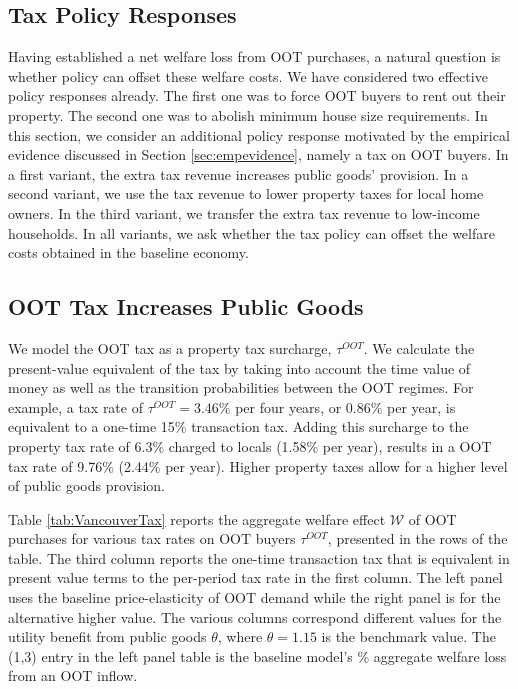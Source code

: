 \documentclass[letterpaper,12pt,dvipsnames,usenames]{article}
\theoremstyle{definition}
\begin{document}
\begin{spacing}{1.25}
{\section{Tax Policy Responses} \label{sec:Vancouver}

Having established a net welfare loss from OOT purchases, a natural question is whether policy can offset these welfare costs. We have considered two effective policy responses already. The first one was to force OOT buyers to rent out their property. The second one was to abolish minimum house size requirements.  In this section, we consider an additional policy response motivated by the empirical evidence discussed in Section \ref{sec:empevidence}, namely a tax on OOT buyers. In a first variant, the extra tax revenue increases public goods' provision. In a second variant, we use the tax revenue to lower property taxes for local home owners. In the third variant, we transfer the extra tax revenue to low-income households. In all variants, we ask whether the tax policy can offset the welfare costs obtained in the baseline economy.

\subsection{OOT Tax Increases Public Goods}

We model the OOT tax as a property tax surcharge, $\tau^{OOT}$. We calculate the present-value equivalent of the tax by taking into account the time value of money as well as the transition probabilities between the OOT regimes. For example, a tax rate of $\tau^{OOT}=3.46\%$ per four years, or 0.86\% per year, is equivalent to a one-time 15\% transaction tax. Adding this surcharge to the property tax rate of 6.3\% charged to locals (1.58\% per year), results in a OOT tax rate of 9.76\% (2.44\% per year). Higher property taxes allow for a higher level of public goods provision.

Table \ref{tab:VancouverTax} reports the aggregate welfare effect $\mathcal{W}$ of OOT purchases for various tax rates on OOT buyers $\tau^{OOT}$, presented in the rows of the table. The third column reports the one-time transaction tax that is equivalent in present value terms to the per-period tax rate in the first column. The left panel uses the baseline price-elasticity of OOT demand while the right panel is for the alternative higher value. The various columns correspond different values for the utility benefit from public goods $\theta$, where $\theta=1.15$ is the benchmark value.  The (1,3) entry in the left panel table is the baseline model's \% aggregate welfare loss from an OOT inflow.


}
\end{spacing}
\end{document}
